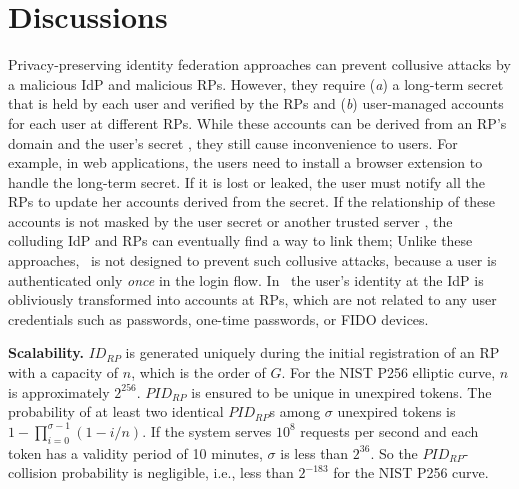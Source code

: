 \section{Discussions}
\label{sec:discussion}


Privacy-preserving identity federation approaches \cite{ELPASSO, UnlimitID, idemix, PseudoID, Opaak, uprov} can prevent collusive attacks by a malicious IdP and malicious RPs.
However, they require (\emph{a}) a long-term secret that is held by each user and verified by the RPs and (\emph{b}) user-managed accounts for each user at different RPs.
While these accounts can be derived from an RP's domain and the user's secret \cite{ELPASSO, UnlimitID, Opaak, uprov,idemix},
 they still cause inconvenience to users.
For example, in web applications, the users need to install a browser extension to handle the long-term secret.
If it is lost or leaked, the user must notify all the RPs to update her accounts derived from the secret.
If the relationship of these accounts is not masked by the user secret or another trusted server \cite{miso},
 the colluding IdP and RPs can eventually find a way to link them;
Unlike these approaches, \usso\ is not designed to prevent such collusive attacks,
 because a user is authenticated only \emph{once} in the login flow.
In \usso\ the user's identity at the IdP is obliviously transformed into accounts at RPs,
 which are not related to any user credentials such as passwords, one-time passwords, %
  or FIDO devices.

\noindent \textbf{Scalability.}
$ID_{RP}$ is generated uniquely during the initial registration of an RP with a capacity of $n$, which is the order of $G$. For the NIST P256 elliptic curve, $n$ is approximately $2^{256}$.
$PID_{RP}$ is ensured to be unique in unexpired tokens.
The probability of at least two identical $PID_{RP}$s among $\sigma$ unexpired tokens is $1-\prod_{i=0}^{\sigma-1}(1-i/n)$.
If the system serves $10^{8}$ requests per second and each token has a validity period of 10 minutes, $\sigma$ is less than $2^{36}$. So the $PID_{RP}$-collision probability is negligible, i.e., less than $2^{-183}$ for the NIST P256 curve.


